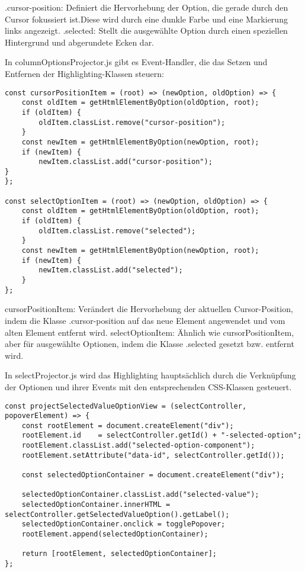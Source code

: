 .cursor-position: Definiert die Hervorhebung der Option, die gerade durch den Cursor fokussiert ist.Diese wird durch eine dunkle Farbe und eine Markierung links angezeigt.
.selected: Stellt die ausgewählte Option durch einen speziellen Hintergrund und abgerundete Ecken dar.


In columnOptionsProjector.js gibt es Event-Handler, die das Setzen und Entfernen der Highlighting-Klassen steuern:

\begin{lstlisting}[style = htmlcssjs, caption = steuren von Highlighting-Klassen]
const cursorPositionItem = (root) => (newOption, oldOption) => {
    const oldItem = getHtmlElementByOption(oldOption, root);
    if (oldItem) {
        oldItem.classList.remove("cursor-position");
    }
    const newItem = getHtmlElementByOption(newOption, root);
    if (newItem) {
        newItem.classList.add("cursor-position");
}
};

const selectOptionItem = (root) => (newOption, oldOption) => {
    const oldItem = getHtmlElementByOption(oldOption, root);
    if (oldItem) {
        oldItem.classList.remove("selected");
    }
    const newItem = getHtmlElementByOption(newOption, root);
    if (newItem) {
        newItem.classList.add("selected");
    }
};
\end{lstlisting}

cursorPositionItem: Verändert die Hervorhebung der aktuellen Cursor-Position, indem die Klasse .cursor-position auf das neue Element angewendet und vom alten Element entfernt wird.
selectOptionItem: Ähnlich wie cursorPositionItem, aber für ausgewählte Optionen, indem die Klasse .selected gesetzt bzw. entfernt wird.

In selectProjector.js wird das Highlighting hauptsächlich durch die Verknüpfung der Optionen und ihrer Events mit den entsprechenden CSS-Klassen gesteuert.

\begin{lstlisting}[style = htmlcssjs, caption = Event-Handling für die Auswahl einer Option]
const projectSelectedValueOptionView = (selectController, popoverElement) => {
    const rootElement = document.createElement("div");
    rootElement.id    = selectController.getId() + "-selected-option";
    rootElement.classList.add("selected-option-component");
    rootElement.setAttribute("data-id", selectController.getId());

    const selectedOptionContainer = document.createElement("div");

    selectedOptionContainer.classList.add("selected-value");
    selectedOptionContainer.innerHTML = selectController.getSelectedValueOption().getLabel();
    selectedOptionContainer.onclick = togglePopover;
    rootElement.append(selectedOptionContainer);

    return [rootElement, selectedOptionContainer];
};
\end{lstlisting}

